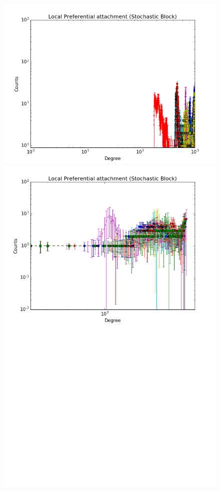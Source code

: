 \documentclass[a4paper, 12pt]{article}
\begin{document}
\begin{figure}[ht]
	\endminipage
		\vspace{-0.29cm}
	\includegraphics[scale=0.27]{img/expe/4_ibp/figure_2}
	\endminipage
	\includegraphics[scale=0.27]{img/expe/5_ibp/figure_2} 
	\endminipage
	\includegraphics[scale=0.27]{img/expe/6_ibp/figure_2}

\end{figure}
\end{document}
